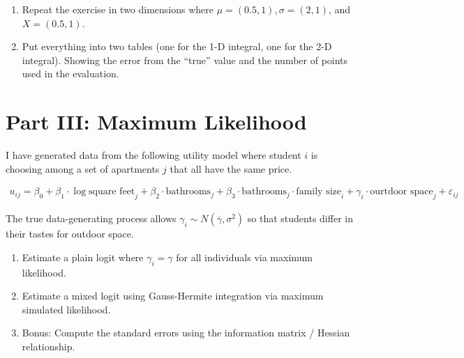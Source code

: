 \documentclass{article}
\begin{document}
\begin{enumerate}
\item Repeat the exercise in two dimensions where $\mu = (0.5,1), \sigma = (2,1)$, and $X=(0.5,1)$.
\item Put everything into two tables (one for the 1-D integral, one for the 2-D integral). Showing the error from the ``true'' value and the number of points used in the evaluation.
\begin{comment}
\begin{table}[htdp]
\caption{2-D Results True value: 0.7145}
\begin{center}
\begin{tabular}{l r r r }
Method & Points & Error\\
quad & n/a & 1e-14 \\
monte carlo & 100 &  0.0174\\
Gauss Hermite(PR) & 25 & 0.0250\\
SGI-GQN & 13 & 0.0091\\
SGI-KPN & 17 & -6.9355e-04\\
\end{tabular}
\end{center}
\end{table}%
\end{comment}
\end{enumerate}

\section*{\normalsize Part III: Maximum Likelihood}
I have generated data from the following utility model where student $i$ is choosing among a set of apartments $j$ that all have the same price.

\begin{align*}
u_{ij} = \beta_0 +\beta_1 \cdot\log \text{square feet}_j + \beta_2 \cdot \text{bathrooms}_{j}
+ \beta_3 \cdot \text{bathrooms}_{j} \cdot \text{family size}_{i}+
 \gamma_i \cdot \text{ourtdoor space}_j + \varepsilon_{ij}
\end{align*}

The true data-generating process allows $\gamma_i \sim N(\overline{\gamma},\sigma^2)$ so that students differ in their tastes for outdoor space.

\begin{enumerate}
\item Estimate a plain logit where $\gamma_i = \gamma$ for all individuals via maximum likelihood.
\item Estimate a mixed logit using Gauss-Hermite integration via maximum simulated likelihood.
\item Bonus: Compute the standard errors using the information matrix / Hessian relationship.
\end{enumerate}
\end{document}
